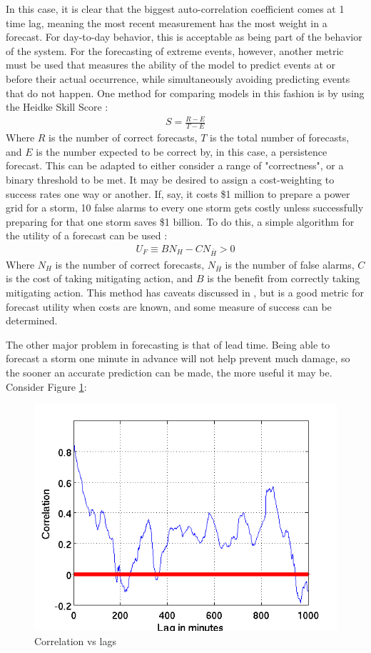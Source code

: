 \documentclass[10pt]{article}
\begin{document}
In this case, it is clear that the biggest auto-correlation coefficient comes at 1 time lag, meaning the most recent measurement has the most weight in a forecast. For day-to-day behavior, this is acceptable as being part of the behavior of the system. For the forecasting of extreme events, however, another metric must be used that measures the ability of the model to predict events at or before their actual occurrence, while simultaneously avoiding predicting events that do not happen. One method for comparing models in this fashion is by using the Heidke Skill Score \citep{Heidke,Brier}:
\begin{align*}
S=\frac{R-E}{T-E}
\end{align*}
Where $R$ is the number of correct forecasts, $T$ is the total number of forecasts, and $E$ is the number expected to be correct by, in this case, a persistence forecast. This can be adapted to either consider a range of "correctness", or a binary threshold to be met. It may be desired to assign a cost-weighting to success rates one way or another. If, say, it costs \$1 million to prepare a power grid for a storm, 10 false alarms to every one storm gets costly unless successfully preparing for that one storm saves \$1 billion. To do this, a simple algorithm for the utility of a forecast can be used \citep{WeigelDecision}:
\begin{align*}
U_F\equiv BN_H-CN_{\bar{H}}>0
\end{align*}
Where $N_H$ is the number of correct forecasts, $N_{\bar{H}}$ is the number of false alarms, $C$ is the cost of taking mitigating action, and $B$ is the benefit from correctly taking mitigating action. This method has caveats discussed in \citep{WeigelDecision}, but is a good metric for forecast utility when costs are known, and some measure of success can be determined. 

The other major problem in forecasting is that of lead time. Being able to forecast a storm one minute in advance will not help prevent much damage, so the sooner an accurate prediction can be made, the more useful it may be. Consider Figure \ref{Lags}:

\begin{figure}[h!]
\centering
\includegraphics[scale=0.50]{GIClags.png}
\caption{Correlation vs lags}
\label{Lags}
\end{figure}
\end{document}
